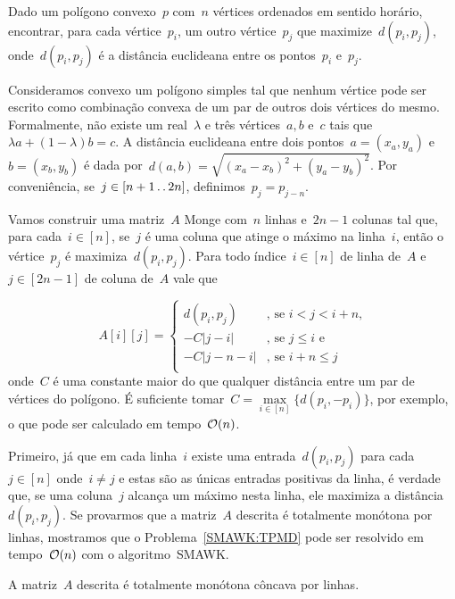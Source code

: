 \begin{prob} \label{SMAWK:TPMD}
Dado um polígono convexo~$p$ com~$n$ vértices ordenados em sentido horário, encontrar, para cada vértice~$p_i$, um outro vértice~$p_j$ que maximize~$d(p_i,p_j)$, onde~$d(p_i,p_j)$ é a distância euclideana entre os pontos~$p_i$ e~$p_j$.
\end{prob}

Consideramos convexo um polígono simples tal que nenhum vértice pode ser escrito como combinação convexa de um par de outros dois vértices do mesmo. Formalmente, não existe um real~$\lambda$ e três vértices~$a,b$ e~$c$ tais que~$\lambda a + (1 - \lambda)b = c$. A distância euclideana entre dois pontos~${ a = (x_a,y_a) }$ e~${ b = (x_b,y_b) }$ é dada por~${ d(a,b) = \sqrt{ (x_a - x_b)^2 + (y_a - y_b)^2 } }$. Por conveniência, se~$j \in [n+1 \,.\,.\, 2n]$, definimos~$p_j = p_{j-n}$.

Vamos construir uma matriz~$A$ Monge com~$n$ linhas e~$2n - 1$ colunas tal que, para cada~$i \in [n]$, se~$j$ é uma coluna que atinge o máximo na linha~$i$, então o vértice~$p_{j}$ é maximiza~$d(p_i,p_j)$. Para todo índice~$i \in [n]$ de linha de~$A$ e~$j \in [2n - 1]$ de coluna de~$A$ vale que

\begin{equation*}
A[i][j] = \begin{cases}
d(p_i,p_j) & \text{, se } i < j < i+n \text{,} \\
-C|j - i| & \text{, se } j \leq i \text{ e } \\
-C|j - n - i| & \text{, se } i + n \leq j \\
\end{cases}
\end{equation*}
onde~$C$ é uma constante maior do que qualquer distância entre um par de vértices do polígono. É suficiente tomar~$C = \max\limits_{i \in [n]}\{d(p_i,-p_i)\}$, por exemplo, o que pode ser calculado em tempo~$\mathcal{O}(n)$.

Primeiro, já que em cada linha~$i$ existe uma entrada~$d(p_i,p_j)$ para cada~$j \in [n]$ onde~$i \neq j$ e estas são as únicas entradas positivas da linha, é verdade que, se uma coluna~$j$ alcança um máximo nesta linha, ele maximiza a distância~$d(p_i,p_j)$. Se provarmos que a matriz~$A$ descrita é totalmente monótona por linhas, mostramos que o Problema~\ref{SMAWK:TPMD} pode ser resolvido em tempo~$\mathcal{O}(n)$ com o algoritmo~\textsc{SMAWK}.

\begin{prop}
A matriz~$A$ descrita é totalmente monótona côncava por linhas.
\end{prop}

